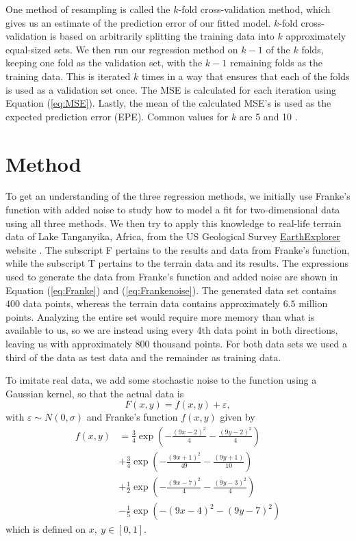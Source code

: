 \documentclass[a4paper, 10pt]{article}
\begin{document}
\begin{multicols}{2}
One method of resampling is called the $k$-fold cross-validation method, which gives us an estimate of the prediction error of our fitted model. $k$-fold cross-validation is based on arbitrarily splitting the training data into $k$ approximately equal-sized sets.  We then run our regression method on $k-1$ of the $k$ folds, keeping one fold as the validation set, with the $k-1$ remaining folds as the training data. This is iterated $k$ times in a way that ensures that each of the folds is used as a validation set once. The MSE is calculated for each iteration using Equation (\ref{eq:MSE}). Lastly, the mean of the calculated MSE's is used as the expected prediction error (EPE).  Common values for $k$ are 5 and 10 \cite{hastie}.


\section{Method}
To get an understanding of the three regression methods, we initially use Franke's function with added noise to study how to model a fit for two-dimensional data using all three methods. We then try to apply this knowledge to real-life terrain data of Lake Tanganyika, Africa, from the US Geological Survey \href{https://earthexplorer.usgs.gov/}{EarthExplorer}  website \cite{earthexplorer} .  The subscript F pertains to the results and data from Franke's function, while the subscript T pertains to the terrain data and its results.  The expressions used to generate the data from Franke's function and added noise are shown in Equation (\ref{eq:Franke}) and (\ref{eq:Frankenoise}). The generated data set contains 400 data points, whereas the terrain data contains approximately $6.5$ million points. Analyzing the entire set would require more memory than what is available to us, so we are instead using every 4th data point in both directions, leaving us with approximately 800 thousand points.  For both data sets we used a third of the data as test data and the remainder as training data.

To imitate real data, we add some stochastic noise to the function using a Gaussian kernel, so that the actual data is
\begin{equation}
F(x, y) = f(x, y) + \varepsilon \label{eq:Frankenoise},
\end{equation}
with $ \varepsilon \sim N(0, \sigma) $ and Franke's function $f(x,y)$ \cite{franke1979critical} given by
\begin{align}
f(x,y) &= \frac{3}{4}\exp{\left(-\frac{(9x-2)^2}{4}   - \frac{(9y-2)^2}{4}\right)} \nonumber\\
 &+\frac{3}{4}\exp{\left(-\frac{(9x+1)^2}{49}- \frac{(9y+1)}{10}\right)} \nonumber\\
 &+\frac{1}{2}\exp{\left(-\frac{(9x-7)^2}{4} - \frac{(9y-3)^2}{4}\right)} \nonumber\\
 &-\frac{1}{5}\exp{\left(-(9x-4)^2 - (9y-7)^2\right) }  \label{eq:Franke}
\end{align} which is defined on $x,\ y \in [0,1]$. 


\end{multicols}
\end{document}
